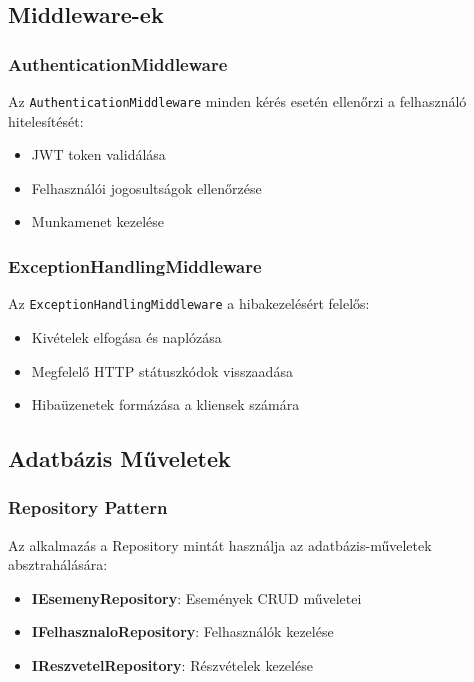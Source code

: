 \documentclass[colorlinks]{thesis-kando}
\theoremstyle{definition}
\theoremstyle{remark}
\begin{document}
 \subsection{Middleware-ek}
 
 \subsubsection{AuthenticationMiddleware}
 
 Az \texttt{AuthenticationMiddleware} minden kérés esetén ellenőrzi a felhasználó hitelesítését:
 
 \begin{itemize}
 	\item JWT token validálása
 	\item Felhasználói jogosultságok ellenőrzése
 	\item Munkamenet kezelése
 \end{itemize}
 
 \subsubsection{ExceptionHandlingMiddleware}
 
 Az \texttt{ExceptionHandlingMiddleware} a hibakezelésért felelős:
 
 \begin{itemize}
 	\item Kivételek elfogása és naplózása
 	\item Megfelelő HTTP státuszkódok visszaadása
 	\item Hibaüzenetek formázása a kliensek számára
 \end{itemize}
 
 \subsection{Adatbázis Műveletek}
 
 \subsubsection{Repository Pattern}
 
 Az alkalmazás a Repository mintát használja az adatbázis-műveletek absztrahálására:
 
 \begin{itemize}
 	\item \textbf{IEsemenyRepository}: Események CRUD műveletei
 	\item \textbf{IFelhasznaloRepository}: Felhasználók kezelése
 	\item \textbf{IReszvetelRepository}: Részvételek kezelése
 \end{itemize}
 
\end{document}
